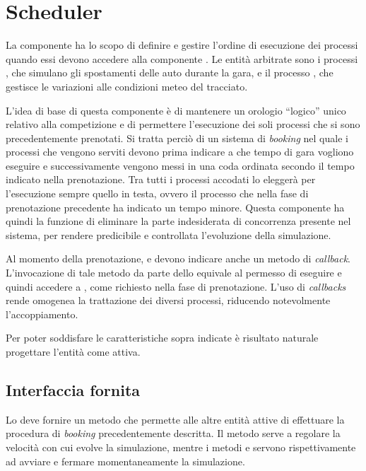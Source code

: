 \section{Scheduler}
La componente \sched{} ha lo scopo di definire e gestire l'ordine di esecuzione dei processi quando essi devono accedere alla componente \track{}.
Le entità arbitrate sono i processi \car{}, che simulano gli spostamenti delle auto durante la gara, e il processo \weather{}, che gestisce le variazioni alle condizioni meteo del tracciato.

L'idea di base di questa componente è di mantenere un orologio ``logico'' unico relativo alla competizione e di permettere l'esecuzione dei soli processi che si sono precedentemente prenotati. Si tratta perciò di un sistema di \textit{booking} nel quale i processi che vengono serviti devono prima indicare a che tempo di gara vogliono eseguire e successivamente vengono messi in una coda ordinata secondo il tempo indicato nella prenotazione. Tra tutti i processi accodati lo \sched{} eleggerà per l'esecuzione sempre quello in testa, ovvero il processo che nella fase di prenotazione precedente ha indicato un tempo minore. Questa componente ha quindi la funzione di eliminare la parte indesiderata di concorrenza presente nel sistema, per rendere predicibile e controllata l'evoluzione della simulazione.

Al momento della prenotazione, \car{} e \weather{} devono indicare anche un metodo di \textit{callback}. L'invocazione di tale metodo da parte dello \sched{} equivale al permesso di eseguire e quindi accedere a \track{}, come richiesto nella fase di prenotazione. L'uso di \textit{callbacks} rende omogenea la trattazione dei diversi processi, riducendo notevolmente l'accoppiamento.

Per poter soddisfare le caratteristiche sopra indicate è risultato naturale progettare l'entità \sched{} come attiva.

\subsection*{Interfaccia fornita}
Lo \sched{} deve fornire un metodo  che permette alle altre entità attive di effettuare la procedura di \textit{booking} precedentemente descritta.
Il metodo  serve a regolare la velocità con cui evolve la simulazione, mentre i metodi  e  servono rispettivamente ad avviare e fermare momentaneamente la simulazione.


